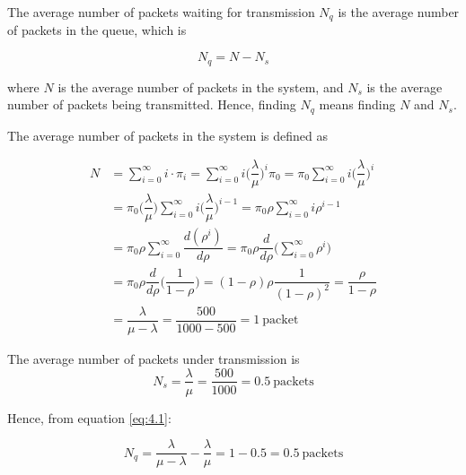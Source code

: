 The average number of packets waiting for transmission $N_q$ is the average
number of packets in the queue, which is

\begin{equation}
  N_q = N - N_s
  \label{eq:4.1}
\end{equation}

where $N$ is the average number of packets in the system, and $N_s$ is the
average number of packets being transmitted. Hence, finding $N_q$ means finding
$N$ and $N_s$.

The average number of packets in the system is defined as

\begin{align*}
  N &= \sum_{i=0}^{\infty} i \cdot \pi_i = \sum_{i=0}^{\infty} i \Big(\dfrac{\lambda}{\mu}\Big)^i \pi_0 =
  \pi_0 \sum_{i=0}^{\infty} i \Big(\dfrac{\lambda}{\mu}\Big)^i \\
  ~ &= \pi_0 \Big(\dfrac{\lambda}{\mu}\Big) \sum_{i=0}^{\infty} i \Big(\dfrac{\lambda}{\mu}\Big)^{i-1} =
  \pi_0 \rho \sum_{i=0}^{\infty} i \rho^{i-1} \\
  ~ &= \pi_0 \rho \sum_{i=0}^{\infty} \dfrac{d(\rho^i)}{d\rho} = \pi_0 \rho \dfrac{d}{d\rho} \Big(\sum_{i=0}^{\infty} \rho^i \Big) \\
  ~ &= \pi_0 \rho \dfrac{d}{d\rho} \Big(\dfrac{1}{1-\rho}\Big) = (1-\rho) \rho \dfrac{1}{(1-\rho)^2} = \dfrac{\rho}{1-\rho} \\
  ~ &= \dfrac{\lambda}{\mu - \lambda} = \dfrac{500}{1000-500} = 1\ \text{packet}
\end{align*}

The average number of packets under transmission is
$$N_s = \dfrac{\lambda}{\mu} = \dfrac{500}{1000} = 0.5\ \text{packets}$$

Hence, from equation \ref{eq:4.1}:

$$N_q = \dfrac{\lambda}{\mu - \lambda} - \dfrac{\lambda}{\mu} = 1 - 0.5 = 0.5\ \text{packets}$$
